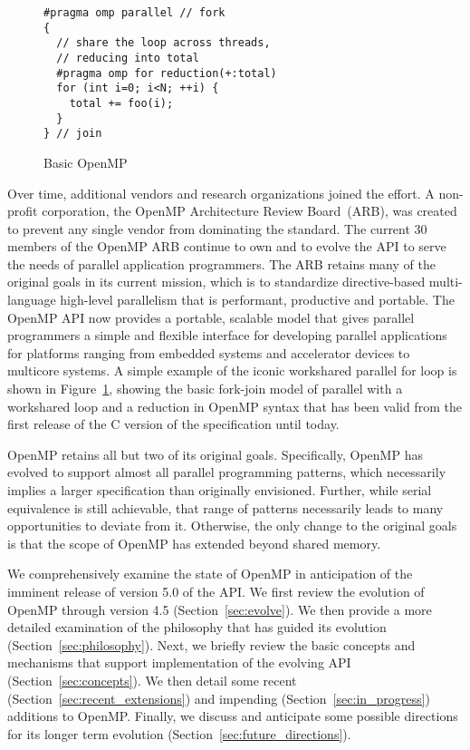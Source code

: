 \begin{figure}
\begin{verbatim}
#pragma omp parallel // fork
{
  // share the loop across threads,
  // reducing into total
  #pragma omp for reduction(+:total)
  for (int i=0; i<N; ++i) {
    total += foo(i);
  }
} // join
\end{verbatim}
\caption{Basic OpenMP\label{fig:basic}}
\end{figure}

Over time, additional vendors and research organizations joined the effort.  A
non-profit corporation, the OpenMP Architecture Review Board~(ARB), was created
to prevent any single vendor from dominating the standard. The current 30
members of the OpenMP ARB continue to own and to evolve the API to serve the
needs of parallel application programmers. The ARB retains many of the original
goals in its current mission, which is to standardize directive-based
multi-language high-level parallelism that is performant, productive and
portable. The OpenMP API now provides a portable, scalable model that gives
parallel programmers a simple and flexible interface for developing parallel
applications for platforms ranging from embedded systems and accelerator
devices to multicore systems.  A simple example of the iconic workshared
parallel for loop is shown in Figure~\ref{fig:basic}, showing the basic
fork-join model of parallel with a workshared loop and a reduction in OpenMP
syntax that has been valid from the first release of the C version of the
specification until today.

OpenMP retains all but two of its original goals. Specifically, OpenMP has 
evolved to support almost all parallel programming patterns, which necessarily
implies a larger specification than originally envisioned. Further, while 
serial equivalence is still achievable, that range of patterns necessarily 
leads to many opportunities to deviate from it. Otherwise, the only change 
to the original goals is that the scope of OpenMP has extended beyond 
shared memory. 

We comprehensively examine the state of OpenMP in anticipation of the imminent 
release of version 5.0 of the API. We first review the evolution of OpenMP 
through version 4.5 (Section~\ref{sec:evolve}). We then provide a more 
detailed examination of the philosophy that has guided its evolution 
(Section~\ref{sec:philosophy}). Next, we briefly review the basic concepts 
and mechanisms that support implementation of the evolving API 
(Section~\ref{sec:concepts}). We then detail some recent 
(Section~\ref{sec:recent_extensions}) and impending 
(Section~\ref{sec:in_progress}) additions to OpenMP. Finally, we discuss
and anticipate some possible directions for its longer term evolution
(Section~\ref{sec:future_directions}).

